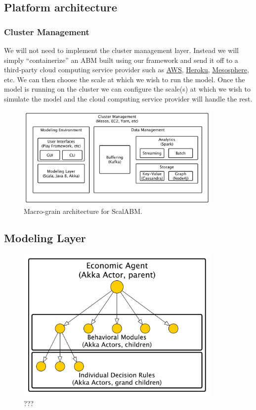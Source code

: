 \documentclass[11pt]{amsart}
\begin{document}
\subsection{Platform architecture}

\subsubsection{Cluster Management}
We will not need to implement the cluster management layer.  Instead we will simply ``containerize'' an ABM built using our framework and send it off to a third-party cloud computing service provider such as \href{http://aws.amazon.com/}{AWS}, \href{https://www.heroku.com/}{Heroku}, \href{https://mesosphere.com/}{Mesosphere}, etc.  We can then choose the scale at which we wish to run the model. Once the model is running on the cluster we can configure the scale(s) at which we wish to simulate the model and the cloud computing service provider will handle the rest.

\begin{figure}[H]
\centering
\includegraphics[width=10cm]{img/coarse-grain-schema-2.pdf}
\caption{Macro-grain architecture for ScalABM. }
\end{figure}


\subsection{Modeling Layer}
\begin{figure}[H]
\centering
\includegraphics[width=10cm]{img/hierarchical-actor.pdf}
\caption{???}
\end{figure}
\end{document}
